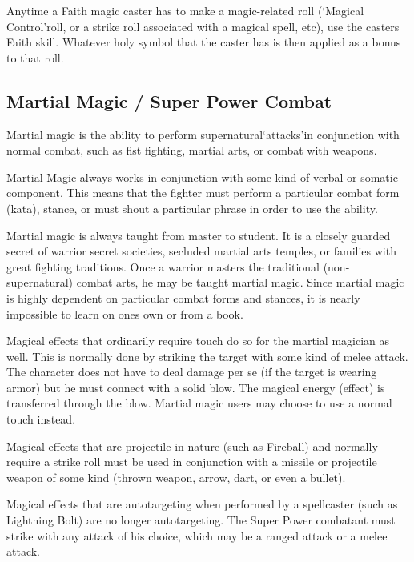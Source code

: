 \documentclass[twoside]{book}
\begin{document}
    {  
    Anytime a Faith magic caster has to make a magic-related roll (`Magical Control'roll, or a strike roll associated with a magical spell, etc), use the casters Faith skill. Whatever holy symbol that the caster has is then applied as a bonus to that roll.
    }
  
    

\subsection{Martial Magic / Super Power Combat}
    
    {  
    Martial magic is the ability to perform supernatural`attacks'in conjunction with normal combat, such as fist fighting, martial arts, or combat with weapons.
    }
  
    {  
    Martial Magic always works in conjunction with some kind of verbal or somatic component. This means that the fighter must perform a particular combat form (kata), stance, or must shout a particular phrase in order to use the ability.
    }
  
    {  
    Martial magic is always taught from master to student. It is a closely guarded secret of warrior secret societies, secluded martial arts temples, or families with great fighting traditions. Once a warrior masters the traditional (non-supernatural) combat arts, he may be taught martial magic. Since martial magic is highly dependent on particular combat forms and stances, it is nearly impossible to learn on ones own or from a book.
    }
  
    {  
    Magical effects that ordinarily require touch do so for the martial magician as well. This is normally done by striking the target with some kind of melee attack. The character does not have to deal damage per se (if the target is wearing armor) but he must connect with a solid blow. The magical energy (effect) is transferred through the blow. Martial magic users may choose to use a normal touch instead.
    }
  
    {  
    Magical effects that are projectile in nature (such as Fireball) and normally require a strike roll must be used in conjunction with a missile or projectile weapon of some kind (thrown weapon, arrow, dart, or even a bullet).
    }
  
    {  
    Magical effects that are autotargeting when performed by a spellcaster (such as Lightning Bolt) are no longer autotargeting. The Super Power combatant must strike with any attack of his choice, which may be a ranged attack or a melee attack.
    }
  
\end{document}
